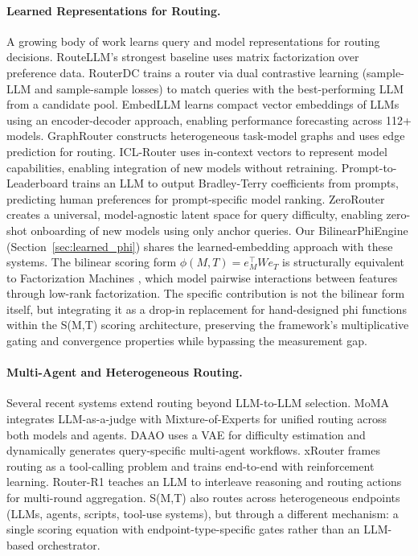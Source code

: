 \paragraph{Learned Representations for Routing.}
A growing body of work learns query and model representations for routing decisions. RouteLLM's strongest baseline uses matrix factorization over preference data. RouterDC \citep{chen2024routerdc} trains a router via dual contrastive learning (sample-LLM and sample-sample losses) to match queries with the best-performing LLM from a candidate pool. EmbedLLM \citep{zhuang2024embedllm} learns compact vector embeddings of LLMs using an encoder-decoder approach, enabling performance forecasting across 112+ models. GraphRouter \citep{feng2024graphrouter} constructs heterogeneous task-model graphs and uses edge prediction for routing. ICL-Router \citep{wang2025iclrouter} uses in-context vectors to represent model capabilities, enabling integration of new models without retraining. Prompt-to-Leaderboard \citep{frick2025p2l} trains an LLM to output Bradley-Terry coefficients from prompts, predicting human preferences for prompt-specific model ranking. ZeroRouter \citep{yan2026zerorouter} creates a universal, model-agnostic latent space for query difficulty, enabling zero-shot onboarding of new models using only anchor queries. Our BilinearPhiEngine (Section~\ref{sec:learned_phi}) shares the learned-embedding approach with these systems. The bilinear scoring form $\phi(M,T) = e_M^\top W e_T$ is structurally equivalent to Factorization Machines \citep{rendle2010factorization}, which model pairwise interactions between features through low-rank factorization. The specific contribution is not the bilinear form itself, but integrating it as a drop-in replacement for hand-designed phi functions within the S(M,T) scoring architecture, preserving the framework's multiplicative gating and convergence properties while bypassing the measurement gap.

\paragraph{Multi-Agent and Heterogeneous Routing.}
Several recent systems extend routing beyond LLM-to-LLM selection. MoMA \citep{moma2025routing} integrates LLM-as-a-judge with Mixture-of-Experts for unified routing across both models and agents. DAAO \citep{daao2025} uses a VAE for difficulty estimation and dynamically generates query-specific multi-agent workflows. xRouter \citep{qian2025xrouter} frames routing as a tool-calling problem and trains end-to-end with reinforcement learning. Router-R1 \citep{zhang2025routerr1} teaches an LLM to interleave reasoning and routing actions for multi-round aggregation. S(M,T) also routes across heterogeneous endpoints (LLMs, agents, scripts, tool-use systems), but through a different mechanism: a single scoring equation with endpoint-type-specific gates rather than an LLM-based orchestrator.

